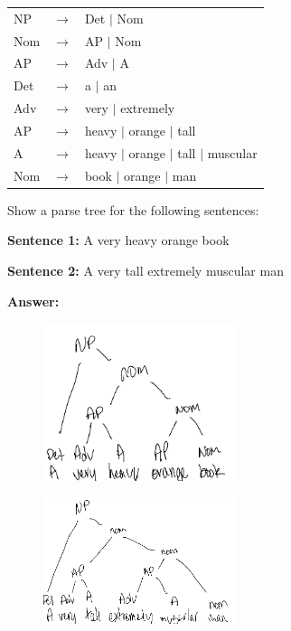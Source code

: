 \documentclass[12pt]{article}
\begin{document}
\begin{tabular}{lll}
      \hline
      NP  & $\rightarrow$ & Det $|$ Nom                            \\
      Nom & $\rightarrow$ & AP $|$ Nom                             \\
      AP  & $\rightarrow$ & Adv $|$ A                              \\
      \hline
      Det & $\rightarrow$ & a $|$ an                               \\
      Adv & $\rightarrow$ & very $|$ extremely                     \\
      AP  & $\rightarrow$ & heavy $|$ orange $|$ tall              \\
      A   & $\rightarrow$ & heavy $|$ orange $|$ tall $|$ muscular \\
      Nom & $\rightarrow$ & book $|$ orange $|$ man                \\
      \hline
\end{tabular}

Show a parse tree for the following sentences:

\textbf{Sentence 1:} A very heavy orange book

\textbf{Sentence 2:} A very tall extremely muscular man

\textbf{Answer:}

\begin{figure}[!ht]
      \centering
      \includegraphics[width=0.5\textwidth]{assets/test2/p3a.png}
\end{figure}

\begin{figure}[!ht]
      \centering
      \includegraphics[width=0.5\textwidth]{assets/test2/p3b.png}
\end{figure}
\end{document}
